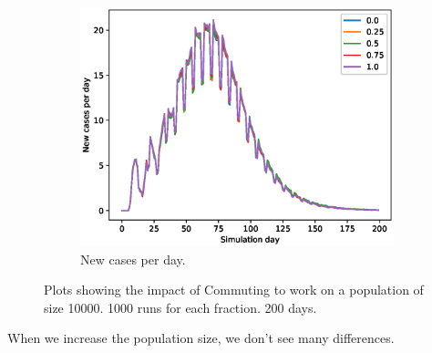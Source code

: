 \documentclass[runningheads]{llncs}
\begin{document}
\begin{figure}[h!]
	\centering
	\begin{subfigure}[b]{0.7\linewidth}
		\includegraphics[width=\textwidth]{work_cases_per_day_3.eps}
		\caption{New cases per day.} 
	\end{subfigure}
	\caption{Plots showing the impact of Commuting to work on a population of size 10000. 1000 runs for each fraction. 200 days.}
	\label{CommutingPlot2}
\end{figure}

\newpage
When we increase the population size, we don't see many differences. 
\end{document}
